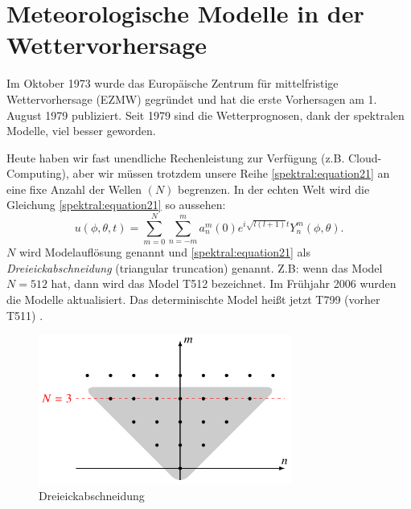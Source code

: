 %
%
%
%
\section{Meteorologische Modelle in der Wettervorhersage
\label{spektral:section:modelle}}

Im Oktober 1973 wurde das Europäische Zentrum für mittelfristige Wettervorhersage (EZMW) gegründet \cite{spektral:ezmw} und hat die erste Vorhersagen am 1. August 1979 publiziert.
Seit 1979 sind die Wetterprognosen, dank der spektralen Modelle, viel besser geworden.

Heute haben wir fast unendliche Rechenleistung zur Verfügung (z.B. Cloud-Computing), aber wir müssen trotzdem unsere Reihe \eqref{spektral:equation21} an eine fixe Anzahl der Wellen $(N)$ begrenzen.
In der echten Welt wird die Gleichung \eqref{spektral:equation21} so aussehen:
\begin{equation}
u(\phi, \theta, t) = \sum_{m=0}^{N}\sum_{n=-m}^{m}a_n^m(0)e^{i\sqrt{l(l+1)}t}Y_n^m(\phi, \theta).
\label{spektral:equation22}
\end{equation}
$N$ wird Modelauflösung genannt \cite[Seite 223]{spektral:NumericalWeatherPrediction} und \eqref{spektral:equation21} als \textit{Dreieickabschneidung} (triangular truncation) genannt.
Z.B: wenn das Model $N = 512$ hat, dann wird das Model T512 bezeichnet. 
Im Frühjahr 2006 wurden die Modelle aktualisiert. Das determinischte Model heißt jetzt T799 (vorher T511) \cite[Seite 222]{spektral:NumericalWeatherPrediction}.
\begin{figure}[h]
	\centering
	\includegraphics[height=140pt]{papers/spektral/images/triangle_truncation.pdf}
	\caption{Dreieickabschneidung}
    \label{spektral:fig:triangletrunc}
\end{figure}

